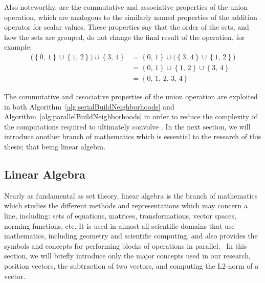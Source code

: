 Also noteworthy, are the commutative and associative properties of the union operation, which are analogous to the similarly named properties of the addition operator for scalar values. These properties say that the order of the sets, and how the sets are grouped, do not change the final result of the operation, for example:
%
\begin{equation}
\begin{aligned}
	\big( \left \{0,\,1\right \} \cup \left \{1,\,2\right \} \big) \cup \left \{3,\,4\right \} & = \left \{0,\,1\right \} \cup \big( \left \{3,\,4\right \} \cup \left \{1,\,2\right \}\big) \\
	& = \left \{0,\,1\right \} \cup \left \{1,\,2\right \} \cup \left \{3,\,4\right \} \\
	& = \left \{0,\,1,\,2,\,3,\,4\right \}
	\label{eq:ascAndComPropertiesOfUnions}
\end{aligned}
\end{equation}

The commutative and associative properties of the union operation are exploited in both Algorithm~\ref{alg:serialBuildNeighborhoods} and Algorithm~\ref{alg:parallelBuildNeighborhoods} in order to reduce the complexity of the computations required to ultimately convolve . In the next section, we will introduce another branch of mathematics which is essential to the research of this thesis; that being linear algebra.

%
%
%
%
\subsection{Linear Algebra}
\label{ch2sETBssLA}
Nearly as fundamental as set theory, linear algebra is the branch of mathematics which studies the different methods and representations which may concern a line, including: sets of equations, matrices, transformations, vector spaces, norming functions, etc. It is used in almost all scientific domains that use mathematics, including geometry and scientific computing, and also provides the symbols and concepts for performing blocks of operations in parallel.~\cite{Weisstein19i} In this section, we will briefly introduce only the major concepts used in our research, position vectors, the subtraction of two vectors, and computing the L2-norm of a vector.

